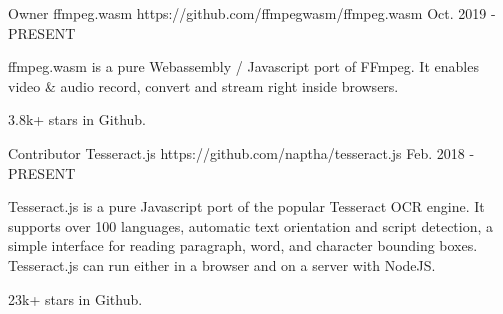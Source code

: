 

\begin{cventries}

  \cventry
    {Owner} %
    {ffmpeg.wasm} %
    {https://github.com/ffmpegwasm/ffmpeg.wasm} %
    {Oct. 2019 - PRESENT} %
    {
      \begin{cvitems} %
        \item {ffmpeg.wasm is a pure Webassembly / Javascript port of FFmpeg. It enables video \& audio record, convert and stream right inside browsers.}
        \item {3.8k+ stars in Github.}
      \end{cvitems}
    }

  \cventry
    {Contributor} %
    {Tesseract.js} %
    {https://github.com/naptha/tesseract.js} %
    {Feb. 2018 - PRESENT} %
    {
      \begin{cvitems} %
        \item {Tesseract.js is a pure Javascript port of the popular Tesseract OCR engine. It supports over 100 languages, automatic text orientation and script detection, a simple interface for reading paragraph, word, and character bounding boxes. Tesseract.js can run either in a browser and on a server with NodeJS.}
        \item {23k+ stars in Github.}
      \end{cvitems}
    }



\end{cventries}
